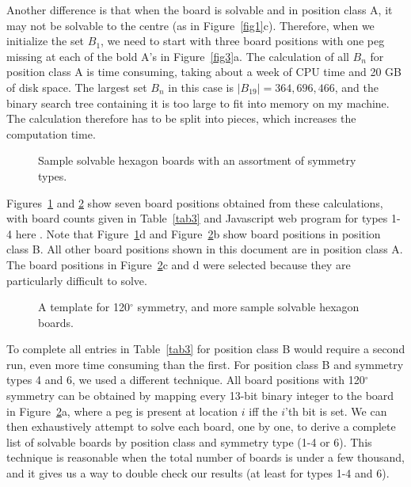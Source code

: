 \documentclass[12pt,reqno]{article}
\begin{document}
Another difference is that when the board is solvable and in position class A,
it may not be solvable to the centre (as in Figure~\ref{fig1}c).
Therefore, when we initialize the set $B_1$,
we need to start with three board positions with one peg missing at each of the
bold A's in Figure~\ref{fig3}a.
The calculation of all $B_n$ for position class A is time consuming,
taking about a week of CPU time and 20 GB of disk space.
The largest set $B_n$ in this case is $|B_{19}| = 364,696,466$,
and the binary search tree containing it is too large to fit into memory on my machine.
The calculation therefore has to be split into pieces, which increases the computation time.

\begin{figure}[htb]
\centering
{}
\caption{Sample solvable hexagon boards with an assortment of symmetry types.}
\label{fig6}
\end{figure}

Figures~\ref{fig6} and \ref{fig10} show seven board positions obtained from these calculations,
with board counts given in Table~\ref{tab3} and Javascript web program for types 1-4 here \cite{BellSymHex}.
Note that Figure~\ref{fig6}d and Figure~\ref{fig10}b show board positions in position class B.
All other board positions shown in this document are in position class A.
The board positions in Figure~\ref{fig10}c and d were selected because they are particularly difficult to solve.

\begin{figure}[htb]
\centering
{}
\caption{A template for 120$^{\circ}$ symmetry, and more sample solvable hexagon boards.}
\label{fig10}
\end{figure}

To complete all entries in Table~\ref{tab3} for position class B would require a second run,
even more time consuming than the first.
For position class B and symmetry types 4 and 6,
we used a different technique.
All board positions with 120$^{\circ}$ symmetry can be obtained by mapping every 13-bit binary integer
to the board in Figure~\ref{fig10}a, where a peg is present at location $i$ iff the $i$'th bit is set.
We can then exhaustively attempt to solve each board, one by one,
to derive a complete list of solvable boards by position class and symmetry type (1-4 or 6).
This technique is reasonable when the total number of boards is under a few thousand,
and it gives us a way to double check our results (at least for types 1-4 and 6).
\end{document}

